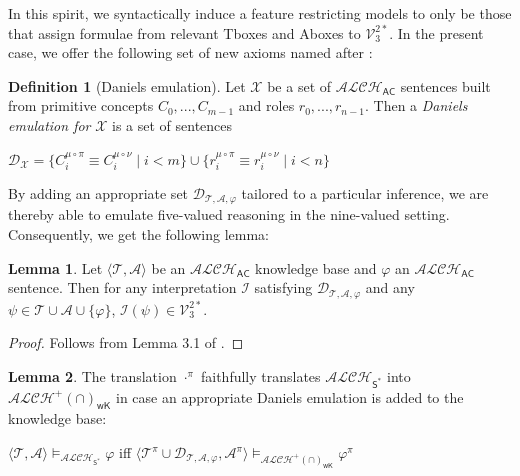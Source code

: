 \documentclass[letterpaper]{article} %
\theoremstyle{definition}
\newtheorem{lemma}{Lemma}
\theoremstyle{definition}
\newtheorem{definition}{Definition}
\theoremstyle{definition}
\theoremstyle{definition}
\theoremstyle{definition}
\begin{document}
\noindent In this spirit, we syntactically induce a feature restricting models to only be those that assign formulae from relevant Tboxes and Aboxes to $\mathcal{V}_3^{2*}$. In the present case, we offer the following set of new axioms named after \cite{Daniels1990-DANANO-3}:



\begin{definition}[Daniels emulation]\label{def:Daniels}
    Let $\mathcal{X}$ be a set of $\mathcal{ALCH}_{\mathsf{AC}}$ sentences built from primitive concepts $C_{0},...,C_{m-1}$ and roles $r_{0},...,r_{n-1}$. Then a \emph{Daniels emulation for} $\mathcal{X}$ is a set of sentences

    \begin{center}
        $\mathcal{D}_{\mathcal{X}}=\lbrace C_{i}^{\mu\circ\pi}\equiv C_{i}^{\mu\circ\nu}\mid i < m\rbrace\cup\lbrace r_{i}^{\mu\circ\pi}\equiv r_{i}^{\mu\circ\nu}\mid i < n\rbrace$
    \end{center}
\end{definition}

\noindent By adding an appropriate set $\mathcal{D}_{\mathcal{T},\mathcal{A},\varphi}$ tailored to a particular inference, we are thereby able to emulate five-valued reasoning in the nine-valued setting. Consequently, we get the following lemma:

\begin{lemma}\label{lem:s-to-ac}
    Let $\langle\mathcal{T},\mathcal{A}\rangle$ be an $\mathcal{ALCH}_{\mathsf{AC}}$ knowledge base and $\varphi$ an $\mathcal{ALCH}_{\mathsf{AC}}$ sentence. Then for any interpretation $\mathcal{I}$ satisfying $\mathcal{D}_{\mathcal{T},\mathcal{A},\varphi}$ and any $\psi\in\mathcal{T}\cup\mathcal{A}\cup\lbrace\varphi\rbrace$, $\mathcal{I}(\psi)\in\mathcal{V}_3^{2*}$.
\end{lemma}

\begin{proof}
    Follows from Lemma 3.1 of \cite{DBLP:conf/dlog/Ferguson21}.
\end{proof}

\begin{lemma}\label{lem:s-to-wk}
    The translation $\cdot^{\pi}$ faithfully translates $\mathcal{ALCH}_{\mathsf{S}^{\ast}}$ into $\mathcal{ALCH}^+(\cap)_{\mathsf{wK}}$ in case an appropriate Daniels emulation is added to the knowledge base:

    \begin{center}
        $\langle\mathcal{T},\mathcal{A}\rangle\vDash_{\mathcal{ALCH}_{\mathsf{S}^{\ast}}}\varphi$ iff $\langle\mathcal{T}^{\pi}\cup\mathcal{D}_{\mathcal{T},\mathcal{A},\varphi},\mathcal{A}^{\pi}\rangle\vDash_{\mathcal{ALCH}^+(\cap)_{\mathsf{wK}}}\varphi^{\pi}$
    \end{center}
\end{lemma}
\end{document}

